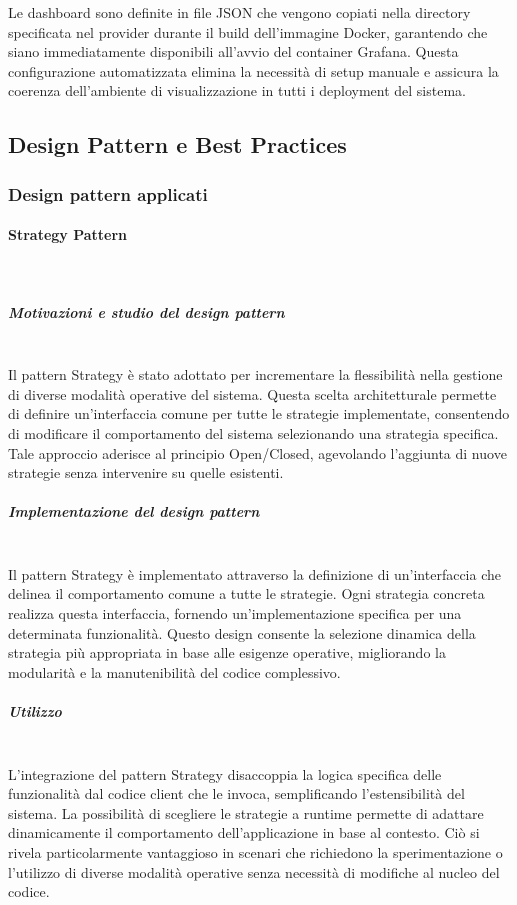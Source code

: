 \documentclass[10pt]{article}
\newcommand{\myparagraph}[1]{\paragraph{#1}\mbox{}\\}
\newcommand{\mysubparagraph}[1]{\subparagraph{#1}\mbox{}\\}
\begin{document}
        Le dashboard sono definite in file JSON che vengono copiati nella directory specificata nel provider durante il build dell'immagine Docker, garantendo che siano immediatamente disponibili all'avvio del container Grafana. Questa configurazione automatizzata elimina la necessità di setup manuale e assicura la coerenza dell'ambiente di visualizzazione in tutti i deployment del sistema.

\subsection{Design Pattern e Best Practices}
\subsubsection{Design pattern applicati}
\myparagraph{Strategy Pattern}

    \mysubparagraph{Motivazioni e studio del design pattern}
    Il pattern Strategy è stato adottato per incrementare la flessibilità nella gestione di diverse modalità operative del sistema. Questa scelta architetturale permette di definire un'interfaccia comune per tutte le strategie implementate, consentendo di modificare il comportamento del sistema selezionando una strategia specifica. Tale approccio aderisce al principio Open/Closed, agevolando l'aggiunta di nuove strategie senza intervenire su quelle esistenti.

    \mysubparagraph{Implementazione del design pattern}
    Il pattern Strategy è implementato attraverso la definizione di un'interfaccia che delinea il comportamento comune a tutte le strategie. Ogni strategia concreta realizza questa interfaccia, fornendo un'implementazione specifica per una determinata funzionalità. Questo design consente la selezione dinamica della strategia più appropriata in base alle esigenze operative, migliorando la modularità e la manutenibilità del codice complessivo.

    \mysubparagraph{Utilizzo}
    L'integrazione del pattern Strategy disaccoppia la logica specifica delle funzionalità dal codice client che le invoca, semplificando l'estensibilità del sistema. La possibilità di scegliere le strategie a runtime permette di adattare dinamicamente il comportamento dell'applicazione in base al contesto. Ciò si rivela particolarmente vantaggioso in scenari che richiedono la sperimentazione o l'utilizzo di diverse modalità operative senza necessità di modifiche al nucleo del codice.
\end{document}
